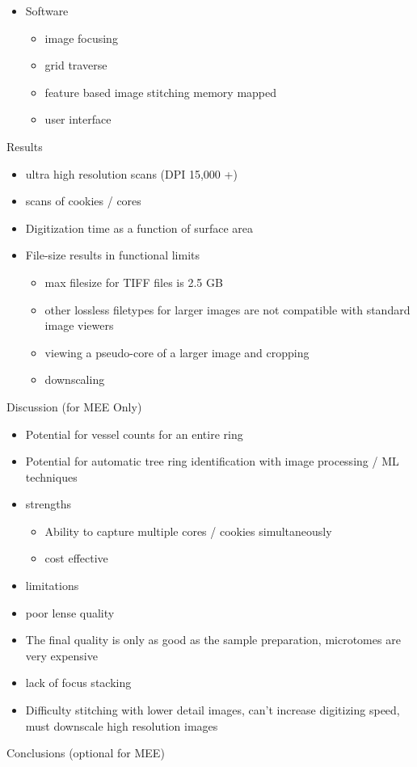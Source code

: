 \documentclass{article}
\begin{document}
\begin{outline}[itemize]
\begin{itemize}
\begin{itemize}
\begin{itemize}
			\end{itemize}
		\item Software
			\begin{itemize}
			\item image focusing
			\item grid traverse
			\item feature based image stitching
			\subitem memory mapped 
			\item user interface
			\end{itemize}
		\end{itemize}
	\end{itemize}
\item Results
	\begin{itemize}
	\item ultra high resolution scans (DPI 15,000 +)
	\item scans of cookies / cores
	\item  Digitization time as a function of surface area
	\item File-size results in functional limits 
		\begin{itemize}
		\item max filesize for TIFF files is 2.5 GB
		\item other lossless filetypes for larger images are not compatible with standard image viewers
		\item viewing a pseudo-core of a larger image and cropping 
		\item downscaling
		\end{itemize}
	\end{itemize}
\item Discussion (for MEE Only)
	\begin{itemize}
	\item Potential for vessel counts for an entire ring 
	\item Potential for automatic tree ring identification with image processing / ML techniques 
	\item strengths
		\begin{itemize}
		\item  Ability to capture multiple cores / cookies simultaneously
		\item cost effective
		\end{itemize}
	\item limitations
		\item poor lense quality
		\item The final quality is only as good as the sample preparation, microtomes are very expensive
		\item lack of focus stacking
		\item Difficulty stitching with lower detail images, can't increase digitizing speed, must downscale high resolution images
	\end{itemize}
\item Conclusions (optional for MEE)

        
\end{outline}
\end{document}
